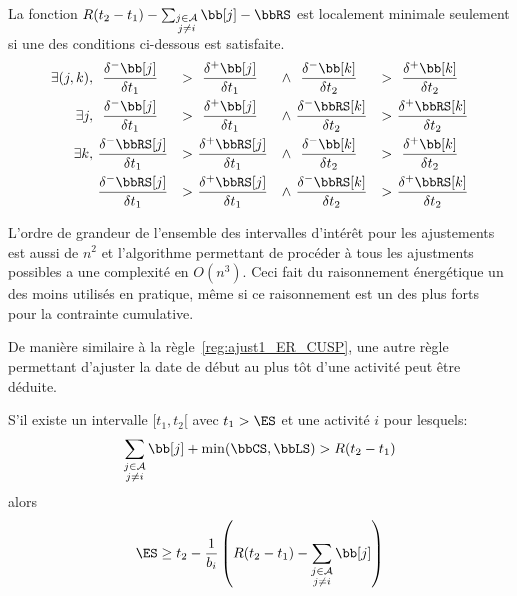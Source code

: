 \begin{lemma}
\label{lem:min_ajust_ER_CUSP}
La fonction $R(t_2-t_1) -\sum_{\substack{j \in \A \\ j \neq i}} \bb[j]
- \bbRS $ est localement minimale seulement si une des conditions
ci-dessous est satisfaite.
\begin{align} 
\exists (j,k), \ &~\frac{\delta^{-}\bb[j]}{\delta t_1}
&>~&~\frac{\delta^{+}\bb[j]}{\delta t_1}
&\land~&~\frac{\delta^{-}\bb[k]}{\delta t_2} & >~&
~\frac{\delta^{+}\bb[k]}{\delta t_2} \label{eq:deriv1_adj_CUSP}\\
\exists j , \ &~\frac{\delta^{-}\bb[j]}{\delta t_1}
&>~&~\frac{\delta^{+}\bb[j]}{\delta t_1}
&\land~&\frac{\delta^{-}\bbRS[k]}{\delta t_2} & >~&
\frac{\delta^{+}\bbRS[k]}{\delta t_2} \label{eq:deriv2_adj_CUSP}\\
\exists k, \ &\frac{\delta^{-}\bbRS[j]}{\delta t_1}
&>~&\frac{\delta^{+}\bbRS[j]}{\delta t_1}
&\land~&~\frac{\delta^{-}\bb[k]}{\delta t_2} & >~&
~\frac{\delta^{+}\bb[k]}{\delta t_2} \label{eq:deriv3_adj_CUSP}\\
 &\frac{\delta^{-}\bbRS[j]}{\delta t_1}
&>~&\frac{\delta^{+}\bbRS[j]}{\delta t_1}
&\land~&\frac{\delta^{-}\bbRS[k]}{\delta t_2} & >~&
\frac{\delta^{+}\bbRS[k]}{\delta t_2} \label{eq:deriv4_adj_CUSP}
\end{align}
\end{lemma}

L'ordre de grandeur de l'ensemble des intervalles d'intérêt pour les
ajustements est aussi de $n^2$ et l'algorithme permettant de procéder
à tous les ajustments possibles a une complexité en $O(n^3)$. Ceci
fait du raisonnement énergétique un des moins utilisés en pratique,
même si ce raisonnement est un des plus forts pour la contrainte
cumulative. 


De manière similaire à la règle~\ref{reg:ajust1_ER_CUSP}, une autre
règle permettant d'ajuster la date de début au plus tôt d'une activité
peut être déduite.

\begin{reg}
  \label{reg:ajust2_ER_CUSP}
  S'il existe un intervalle $[t_1,t_2[$ avec $t_1 > \ES$ et une
activité $i$ pour lesquels:
  \[ \sum_{\substack{j \in \A \\ j \neq i}} \bb[j] +
    \min(\bbCS,\bbLS) > R (t_2-t_1)\] 
  alors 
  \[  \ES \ge t_2 - \frac{1}{b_i} \left(R (t_2-t_1)  -\sum_{\substack{j \in \A \\ j
          \neq i}} \bb[j]  \right) \]
\end{reg}

